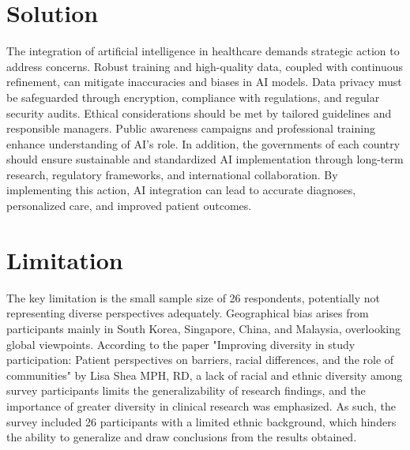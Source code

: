 \documentclass{ieeeaccess}
\begin{document}
\section{Solution}
The integration of artificial intelligence in healthcare demands strategic action to address concerns. Robust training and high-quality data, coupled with continuous refinement, can mitigate inaccuracies and biases in AI models. Data privacy must be safeguarded through encryption, compliance with regulations, and regular security audits. Ethical considerations should be met by tailored guidelines and responsible managers. Public awareness campaigns and professional training enhance understanding of AI's role. In addition, the governments of each country should ensure sustainable and standardized AI implementation through long-term research, regulatory frameworks, and international collaboration. By implementing this action, AI integration can lead to accurate diagnoses, personalized care, and improved patient outcomes.

\section{Limitation}
The key limitation is the small sample size of 26 respondents, potentially not representing diverse perspectives adequately. Geographical bias arises from participants mainly in South Korea, Singapore, China, and Malaysia, overlooking global viewpoints. According to the paper "Improving diversity in study participation: Patient perspectives on barriers, racial differences, and the role of communities" by Lisa Shea MPH, RD, a lack of racial and ethnic diversity among survey participants limits the generalizability of research findings, and the importance of greater diversity in clinical research was emphasized. As such, the survey included 26 participants with a limited ethnic background, which hinders the ability to generalize and draw conclusions from the results obtained.
\end{document}
